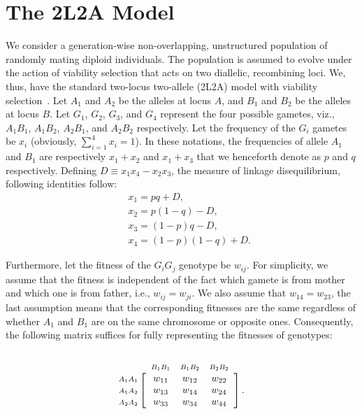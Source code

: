 \documentclass[
 pre,
 aps,
 a4paper,
 english,
 showkeys,
 reprint,
 twocolumn,
 superscriptaddress
]{revtex4}
\newcommand{\indsize}{\scriptsize}
\newcommand{\colind}[2]{\displaystyle\smash{\mathop{#1}^{\raisebox{.5\normalbaselineskip}{\indsize #2}}}}
\newcommand{\rowind}[1]{\mbox{\indsize #1}}
\begin{document}
\section{The 2L2A Model}\label{section_2} 
We consider a generation-wise non-overlapping, unstructured population of randomly mating diploid individuals. The population is assumed to evolve under the action of viability selection that acts on two diallelic, recombining loci. We, thus, have the standard two-locus two-allele (2L2A) model with viability selection~\cite{pontz2018JMB,Karlin1975tpb,Karlin1975numericaltpb,Sacker2003jdea,Hallgrmsdttir2008genetics,Lewontin1988tpb,Franklin1977tpb,bodmer1967genetics}. Let $A_1$ and $A_2$ be the alleles at locus $A$, and $B_1$ and $B_2$ be the alleles at locus $B$. Let $G_1$, $G_2$, $G_3$, and $G_4$ represent the four possible gametes, viz., $A_1B_1$, $A_1B_2$, $A_2B_1$, and $A_2B_2$ respectively. Let the frequency of the $G_i$ gametes be $x_i$ (obviously, $\sum_{i=1}^4x_i=1$). {\color{black}In these notations}, the  frequencies of allele \(A_1\) and \(B_1\) are respectively \(x_1+x_2\) and \(x_1+x_3\) that we henceforth denote as $p$ and $q$ respectively. Defining \(D\equiv x_1x_4-x_2x_3\), the measure of linkage disequilibrium, following identities follow:
\begin{subequations}
\label{eqn:frequencis of gametes}
\begin{eqnarray}
&&x_1=pq+D,\\
&&x_2=p(1-q)-D,\\
&&x_3=(1-p)q-D,\\
&&x_4=(1-p)(1-q)+D.
\end{eqnarray}
\end{subequations}


Furthermore, let the fitness of the $G_iG_j$ genotype be $w_{ij}$. For simplicity, we assume that the fitness is independent of the fact which gamete is from mother and which one is from father, i.e., $w_{ij}=w_{ji}$. We also  assume that $w_{14}=w_{23}$, the last assumption means that the corresponding fitnesses are the same regardless of whether $A_1$ and $B_1$ are on the same chromosome or opposite ones. Consequently,  the following matrix suffices for fully representing the fitnesses of genotypes:
\[
\begin{array}{@{}c@{}}\label{matrix_3}
\rowind{$A_1A_1$} \\ \rowind{$A_1A_2$} \\ \rowind{$A_2A_2$}  
\end{array}
\mathop{\left[
	\begin{array}{ *{5}{c} }
	\colind{w_{11}}{$B_1B_1$}  &  \colind{w_{12}}{$B_1B_2$}  &  \colind{w_{22}}{$B_2B_2$}  \\
	w_{13} &  w_{14}  &  w_{24} \\
	w_{33}  & w_{34} &  w_{44} 
	\end{array}
	\right].}^{
	\begin{array}{@{}c@{}}
	\\ \mathstrut
	\end{array}
}
\]
\end{document}
